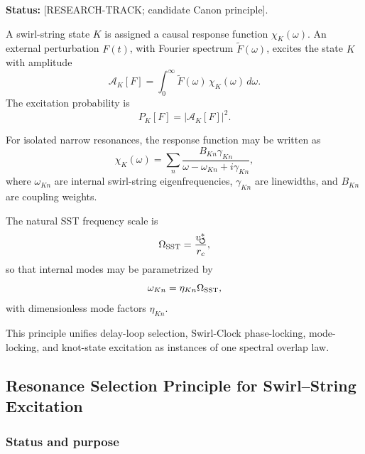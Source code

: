     \noindent
    \textbf{Status:} [RESEARCH-TRACK; candidate Canon principle].
    
    A swirl-string state \(K\) is assigned a causal response function
    \(\chi_K(\omega)\). An external perturbation \(F(t)\), with Fourier
    spectrum \(\widetilde F(\omega)\), excites the state \(K\) with amplitude
    \begin{equation}
        \mathcal A_K[F]
        =
        \int_0^\infty
        \widetilde F(\omega)\,
        \chi_K(\omega)\,
        d\omega .
    \end{equation}
    The excitation probability is
    \begin{equation}
        P_K[F]
        =
        |\mathcal A_K[F]|^2 .
    \end{equation}
    
    For isolated narrow resonances, the response function may be written as
    \begin{equation}
        \chi_K(\omega)
        =
        \sum_n
        \frac{B_{Kn}\gamma_{Kn}}
        {\omega-\omega_{Kn}+i\gamma_{Kn}},
    \end{equation}
    where \(\omega_{Kn}\) are internal swirl-string eigenfrequencies,
    \(\gamma_{Kn}\) are linewidths, and \(B_{Kn}\) are coupling weights.
    
    The natural SST frequency scale is
    \begin{equation}
        \Omega_{\rm SST}
        =
        \frac{v_{\!\boldsymbol{\circlearrowleft}}^{\ast}}{r_c},
    \end{equation}
    so that internal modes may be parametrized by
    \begin{equation}
        \omega_{Kn}
        =
        \eta_{Kn}\Omega_{\rm SST},
    \end{equation}
    with dimensionless mode factors \(\eta_{Kn}\).
    
    This principle unifies delay-loop selection, Swirl-Clock phase-locking,
    mode-locking, and knot-state excitation as instances of one spectral
    overlap law.
    
    
\subsection{Resonance Selection Principle for Swirl--String Excitation}
    \label{app:resonance-selection-principle}
    
    \subsubsection*{Status and purpose}
        
